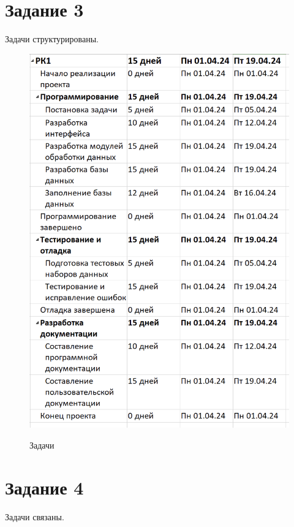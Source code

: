 \section{Задание 3}

Задачи структурированы.

\begin{figure}[ht!]
	\includegraphics[width=0.75\linewidth]{assets/images/3-tasks.png}
	\label{fig:r2}
	\caption{Задачи}
\end{figure}
\FloatBarrier

\section{Задание 4}

Задачи связаны.

